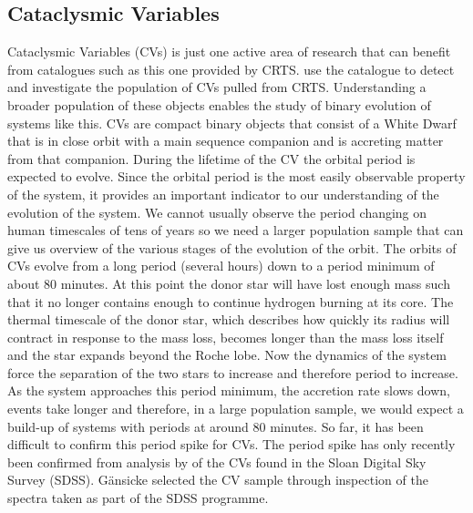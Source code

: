 \documentclass[a4paper,fleqn,usenatbib]{mnras}
\begin{document}
\subsection{Cataclysmic Variables}
Cataclysmic Variables (CVs) is just one active area of research that can benefit from catalogues such as this one provided by CRTS. \citet{Breedt2014} use the catalogue to detect and investigate the population of CVs pulled from CRTS. Understanding a broader population of these objects enables the study of binary evolution of systems like this. CVs are compact binary objects that consist of a White Dwarf that is in close orbit with a main sequence companion and is accreting matter from that companion. During the lifetime of the CV the orbital period is expected to evolve. Since the orbital period is the most easily observable property of the system, it provides an important indicator to our understanding of the evolution of the system. We cannot usually observe the period changing on human timescales of tens of years so we need a larger population sample that can give us overview of the various stages of the evolution of the orbit. The orbits of CVs evolve from a long period (several hours) down to a period minimum of about 80 minutes. At this point the donor star will have lost enough mass such that it no longer contains enough to continue hydrogen burning at its core. The thermal timescale of the donor star, which describes how quickly its radius will contract in response to the mass loss, becomes longer than the mass loss itself and the star expands beyond the Roche lobe. Now the dynamics of the system force the separation of the two stars to increase and therefore period to increase. As the system approaches this period minimum, the accretion rate slows down, events take longer and therefore, in a large population sample, we would expect a build-up of systems with periods at around 80 minutes. So far, it has been difficult to confirm this period spike for CVs.  The period spike has only recently been confirmed from analysis by \citet{Gaensicke2009} of the CVs found in the Sloan Digital Sky Survey (SDSS).  G{\"a}nsicke selected the CV sample through inspection of the spectra taken as part of the SDSS programme. 
\end{document}
